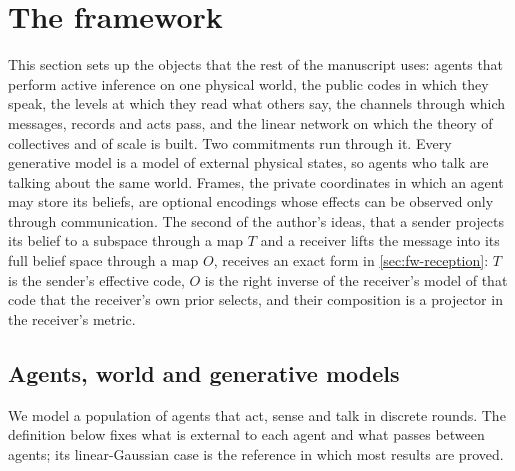 \section{The framework}\label{sec:fw}

This section sets up the objects that the rest of the manuscript uses: agents that perform active inference on one physical world, the public codes in which they speak, the levels at which they read what others say, the channels through which messages, records and acts pass, and the linear network on which the theory of collectives and of scale is built. Two commitments run through it. Every generative model is a model of external physical states, so agents who talk are talking about the same world. Frames, the private coordinates in which an agent may store its beliefs, are optional encodings whose effects can be observed only through communication. The second of the author's ideas, that a sender projects its belief to a subspace through a map $T$ and a receiver lifts the message into its full belief space through a map $O$, receives an exact form in \cref{sec:fw-reception}: $T$ is the sender's effective code, $O$ is the right inverse of the receiver's model of that code that the receiver's own prior selects, and their composition is a projector in the receiver's metric.

\subsection{Agents, world and generative models}\label{sec:fw-model}

We model a population of agents that act, sense and talk in discrete rounds. The definition below fixes what is external to each agent and what passes between agents; its linear-Gaussian case is the reference in which most results are proved.

